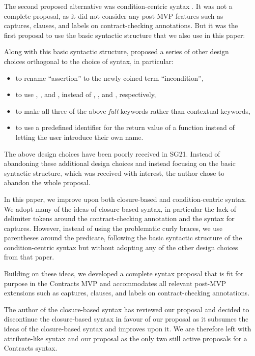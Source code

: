 The second proposed alternative was condition-centric syntax \cite{P2737R0}. It was not a complete proposal, as it did not consider any post-MVP features such as captures,  clauses, and labels on contract-checking annotations. But it was the first proposal to use the basic syntactic structure that we also use in this paper:

\phantom{~~~}

Along with this basic syntactic structure, \cite{P2737R0} proposed a series of other design choices orthogonal to the choice of syntax, in particular:
\begin{itemize}
\item to rename ``assertion'' to the newly coined term ``incondition'',
\item to use , , and , instead of , , and , respectively,
\item to make all three of the above \emph{full} keywords rather than contextual keywords,
\item to use a predefined identifier  for the return value of a function instead of letting the user introduce their own name.
\end{itemize}
The above design choices have been poorly received in SG21. Instead of abandoning these additional design choices and instead focusing on the basic syntactic structure, which was received with interest, the author chose to abandon the whole proposal.

In this paper, we improve upon both closure-based and condition-centric syntax. We adopt many of the ideas of closure-based syntax, in particular the lack of delimiter tokens around the contract-checking annotation and the syntax for captures. However, instead of using the problematic curly braces, we use parentheses around the predicate, following the basic syntactic structure of the condition-centric syntax \cite{P2737R0} but without adopting any of the other design choices from that paper.

Building on these ideas, we developed a complete syntax proposal that is fit for purpose in the Contracts MVP and accommodates all relevant post-MVP extensions such as captures,  clauses, and labels on contract-checking annotations.

The author of the closure-based syntax has reviewed our proposal and decided to discontinue the closure-based syntax in favour of our proposal as it subsumes the ideas of the closure-based syntax and improves upon it. We are therefore left with attribute-like syntax and our proposal as the only two still active proposals for a Contracts syntax.


